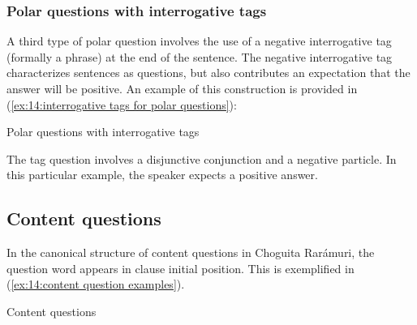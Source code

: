 \subsubsection{Polar questions with interrogative tags}
\label{subsubsec: Polar questions with interrogative tags}

A third type of polar question involves the use of a negative interrogative tag (formally a phrase) at the end of the sentence. The negative interrogative tag characterizes sentences as questions, but also contributes an expectation that the answer will be positive. An example of this construction is provided in (\ref{ex:14:interrogative tags for polar questions}):

\ea\label{ex:14:interrogative tags for polar questions}
{Polar questions with interrogative tags}

    \z
\z

The tag question involves a disjunctive conjunction and a negative particle. In this particular example, the speaker expects a positive answer.

\subsection{Content questions}
\label{subsec: content questions}

In the canonical structure of content questions in Choguita Rarámuri, the question word appears in clause initial position. This is exemplified in (\ref{ex:14:content question examples}).

\ea\label{ex:14:content question examples}
{Content questions}

    \z
\z

